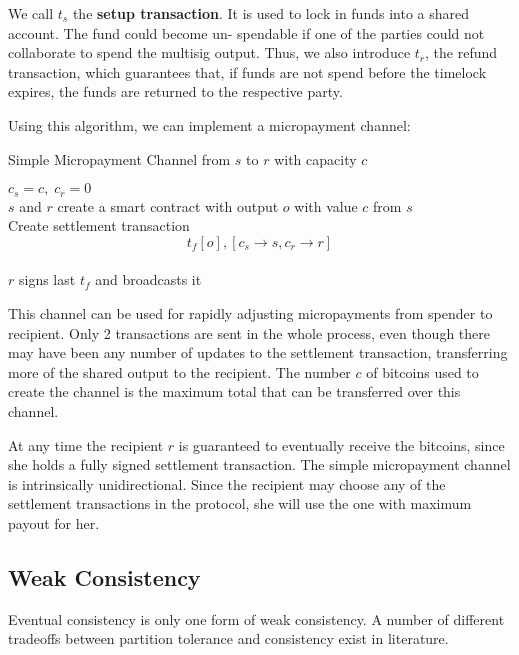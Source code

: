 We call $t_s$ the \textbf{setup transaction}. It is used to lock in funds into a shared account. The fund could become un- spendable if one of the parties could not collaborate to spend the multisig output. Thus, we also introduce $t_r$, the refund transaction, which guarantees that, if funds are not spend before the timelock expires, the funds are returned to the respective party. \medskip

Using this algorithm, we can implement a micropayment channel:\medskip

\begin{algorithm}[H]
\caption{Simple Micropayment Channel from $s$ to $r$ with capacity $c$}
	$c_s = c,\; c_r = 0$\\
	$s$ and $r$ create a smart contract with output $o$ with value $c$ from $s$\\
	Create settlement transaction $$t_f {[o], [c_s \to s, c_r \to r]}$$\\
	$r$ signs last $t_f$ and broadcasts it
\end{algorithm}
\medskip


This channel can be used for rapidly adjusting micropayments from spender to recipient. Only 2 transactions are sent in the whole process, even though there may have been any number of updates to the settlement transaction, transferring more of the shared output to the recipient. The number $c$ of bitcoins used to create the channel is the maximum total that can be transferred over this channel. \medskip

At any time the recipient $r$ is guaranteed to eventually receive the bitcoins, since she holds a fully signed settlement transaction. The simple micropayment channel is intrinsically unidirectional. Since the recipient may choose any of the settlement transactions in the protocol, she will use the one with maximum payout for her.


\subsection{Weak Consistency}

Eventual consistency is only one form of weak consistency. A number of different tradeoffs between partition tolerance and consistency exist in literature. \medskip

